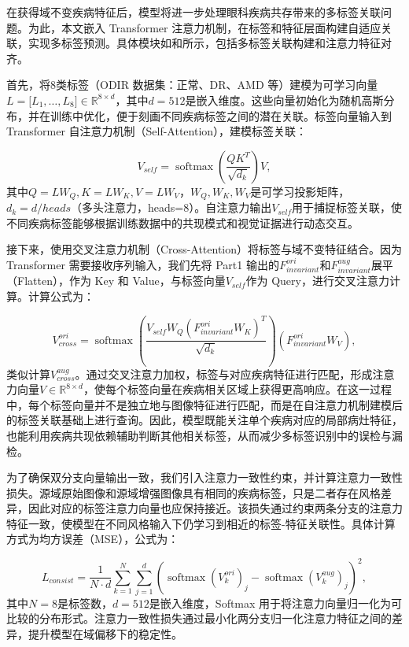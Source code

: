在获得域不变疾病特征后，模型将进一步处理眼科疾病共存带来的多标签关联问题。为此，本文嵌入 Transformer 注意力机制，在标签和特征层面构建自适应关联，实现多标签预测。具体模块如和所示，包括多标签关联构建和注意力特征对齐。

首先，将8类标签（ODIR 数据集：正常、DR、AMD 等）建模为可学习向量\(L = \lbrack L_{1},\ldots,L_{8}\rbrack \in \mathbb{R}^{8 \times d}\)，其中\(d = 512\)是嵌入维度。这些向量初始化为随机高斯分布，并在训练中优化，便于刻画不同疾病标签之间的潜在关联。标签向量输入到 Transformer 自注意力机制（Self-Attention），建模标签关联：

\begin{equation}\label{eq:self-attention}
V_{self} = \operatorname{softmax}\left(\frac{QK^{T}}{\sqrt{d_{k}}}\right)V,
\end{equation}
其中\(Q = LW_{Q},K = LW_{K},V = LW_{V}\)，\(W_{Q},W_{K},W_{V}\)是可学习投影矩阵，\(d_{k} = d/heads\)（多头注意力，heads=8）。自注意力输出\(V_{self}\)用于捕捉标签关联，使不同疾病标签能够根据训练数据中的共现模式和视觉证据进行动态交互。

接下来，使用交叉注意力机制（Cross-Attention）将标签与域不变特征结合。因为 Transformer 需要接收序列输入，我们先将 Part1 输出的\(F_{invariant}^{ori}\)和\(F_{invariant}^{aug}\)展平（Flatten），作为 Key 和 Value，与标签向量\(V_{self}\)作为 Query，进行交叉注意力计算。计算公式为：

\begin{equation}\label{eq:cross-attention}
V_{cross}^{ori} = \operatorname{softmax}\left(\frac{V_{self}W_{Q}(F_{invariant}^{ori}W_{K})^{T}}{\sqrt{d_{k}}}\right)(F_{invariant}^{ori}W_{V}),
\end{equation}
类似计算\(V_{cross}^{aug}\)。通过交叉注意力加权，标签与对应疾病特征进行匹配，形成注意力向量\(V \in \mathbb{R}^{8 \times d}\)，使每个标签向量在疾病相关区域上获得更高响应。在这一过程中，每个标签向量并不是独立地与图像特征进行匹配，而是在自注意力机制建模后的标签关联基础上进行查询。因此，模型既能关注单个疾病对应的局部病灶特征，也能利用疾病共现依赖辅助判断其他相关标签，从而减少多标签识别中的误检与漏检。

为了确保双分支向量输出一致，我们引入注意力一致性约束，并计算注意力一致性损失。源域原始图像和源域增强图像具有相同的疾病标签，只是二者存在风格差异，因此对应的标签注意力向量也应保持接近。该损失通过约束两条分支的注意力特征一致，使模型在不同风格输入下仍学习到相近的标签-特征关联性。具体计算方式为均方误差（MSE），公式为：

\begin{equation}\label{eq:consistency-loss}
L_{consist} = \frac{1}{N \cdot d}\sum_{k = 1}^{N}\sum_{j = 1}^{d}
\left(
\operatorname{softmax}\left( V_{k}^{ori} \right)_{j}
-
\operatorname{softmax}\left( V_{k}^{aug} \right)_{j}
\right)^{2},
\end{equation}
其中\(N = 8\)是标签数，\(d = 512\)是嵌入维度，Softmax 用于将注意力向量归一化为可比较的分布形式。注意力一致性损失通过最小化两分支归一化注意力特征之间的差异，提升模型在域偏移下的稳定性。


